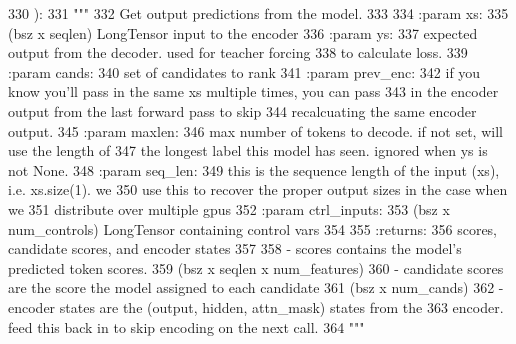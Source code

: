 \begin{DoxyCode}
330     ):
331         \textcolor{stringliteral}{"""}
332 \textcolor{stringliteral}{        Get output predictions from the model.}
333 \textcolor{stringliteral}{}
334 \textcolor{stringliteral}{        :param xs:}
335 \textcolor{stringliteral}{            (bsz x seqlen) LongTensor input to the encoder}
336 \textcolor{stringliteral}{        :param ys:}
337 \textcolor{stringliteral}{            expected output from the decoder. used for teacher forcing}
338 \textcolor{stringliteral}{            to calculate loss.}
339 \textcolor{stringliteral}{        :param cands:}
340 \textcolor{stringliteral}{            set of candidates to rank}
341 \textcolor{stringliteral}{        :param prev\_enc:}
342 \textcolor{stringliteral}{            if you know you'll pass in the same xs multiple times, you can pass}
343 \textcolor{stringliteral}{            in the encoder output from the last forward pass to skip}
344 \textcolor{stringliteral}{            recalcuating the same encoder output.}
345 \textcolor{stringliteral}{        :param maxlen:}
346 \textcolor{stringliteral}{            max number of tokens to decode. if not set, will use the length of}
347 \textcolor{stringliteral}{            the longest label this model has seen. ignored when ys is not None.}
348 \textcolor{stringliteral}{        :param seq\_len:}
349 \textcolor{stringliteral}{            this is the sequence length of the input (xs), i.e. xs.size(1). we}
350 \textcolor{stringliteral}{            use this to recover the proper output sizes in the case when we}
351 \textcolor{stringliteral}{            distribute over multiple gpus}
352 \textcolor{stringliteral}{        :param ctrl\_inputs:}
353 \textcolor{stringliteral}{            (bsz x num\_controls) LongTensor containing control vars}
354 \textcolor{stringliteral}{}
355 \textcolor{stringliteral}{        :returns:}
356 \textcolor{stringliteral}{            scores, candidate scores, and encoder states}
357 \textcolor{stringliteral}{}
358 \textcolor{stringliteral}{            - scores contains the model's predicted token scores.}
359 \textcolor{stringliteral}{              (bsz x seqlen x num\_features)}
360 \textcolor{stringliteral}{            - candidate scores are the score the model assigned to each candidate}
361 \textcolor{stringliteral}{              (bsz x num\_cands)}
362 \textcolor{stringliteral}{            - encoder states are the (output, hidden, attn\_mask) states from the}
363 \textcolor{stringliteral}{              encoder. feed this back in to skip encoding on the next call.}
364 \textcolor{stringliteral}{        """}

\end{DoxyCode}
